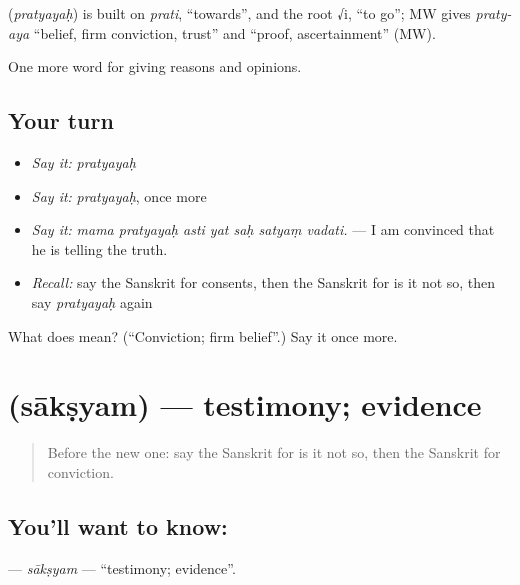 \begin{cousinweb}
\textbf{} (\emph{pratyayaḥ}) is built on \emph{prati}, \textquotedblleft{}towards\textquotedblright{}, and the root √i, \textquotedblleft{}to go\textquotedblright{}; MW gives \emph{praty-aya} \textquotedblleft{}belief, firm conviction, trust\textquotedblright{} and \textquotedblleft{}proof, ascertainment\textquotedblright{} (MW).
\end{cousinweb}

\begin{grammarlens}[title={What you've built}]
One more word for giving reasons and opinions.
\end{grammarlens}

\subsection*{Your turn}
\begin{itemize}
\raggedright
  \item \emph{Say it:} \emph{pratyayaḥ}
  \item \emph{Say it:} \emph{pratyayaḥ}, once more
  \item \emph{Say it:} \emph{mama pratyayaḥ asti yat saḥ satyaṃ vadati.} — I am convinced that he is telling the truth.
  \item \emph{Recall:} say the Sanskrit for consents, then the Sanskrit for is it not so, then say \emph{pratyayaḥ} again
\end{itemize}

\begin{tcolorbox}[breakable,colback=teal!4,colframe=teal!35!black,title={Before you move on}]
What does  mean? (\textquotedblleft{}Conviction; firm belief\textquotedblright{}.) Say it once more.
\end{tcolorbox}
\section[\texorpdfstring{\sk{साक्ष्यम्} (sākṣyam)}{साक्ष्यम् (sākṣyam)}]{ (sākṣyam) — testimony; evidence}

\label{lesson:SA-C345-saksyam}



\begin{quote}
Before the new one: say the Sanskrit for is it not so, then the Sanskrit for conviction.
\end{quote}

\subsection*{You'll want to know: }
\textbf{} — \emph{sākṣyam} — \textquotedblleft{}testimony; evidence\textquotedblright{}.

